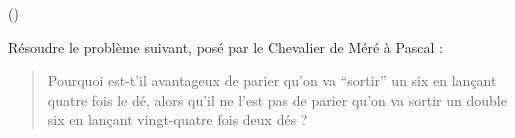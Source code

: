 \begin{exercice}\label{exo3-14} (\mortelexo)

R\'esoudre le probl\`eme suivant, pos\'e par le Chevalier de M\'er\'e \`a Pascal :

\begin{quote}
Pourquoi est-t'il avantageux de parier qu'on va ``sortir'' un six en lan\c{c}ant quatre fois le d\'e, alors qu'il ne l'est pas de parier qu'on va sortir un double six en lan\c{c}ant vingt-quatre fois deux d\'es ?
\end{quote}


\end{exercice}
